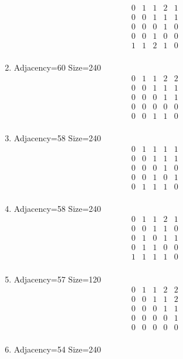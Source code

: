 \documentclass[12pt]{article}
\begin{document}
\begin{multicols}{3}
\begin{enumerate}
\begin{equation*}
\begin{array}{ccccc}
0&1&1&2&1\\
0&0&1&1&1\\
0&0&0&1&0\\
0&0&1&0&0\\
1&1&2&1&0\\
\end{array}
\end{equation*}
\item Adjacency=60 Size=240
\begin{equation*}
\begin{array}{ccccc}
0&1&1&2&2\\
0&0&1&1&1\\
0&0&0&1&1\\
0&0&0&0&0\\
0&0&1&1&0\\
\end{array}
\end{equation*}
\item Adjacency=58 Size=240
\begin{equation*}
\begin{array}{ccccc}
0&1&1&1&1\\
0&0&1&1&1\\
0&0&0&1&0\\
0&0&1&0&1\\
0&1&1&1&0\\
\end{array}
\end{equation*}
\item Adjacency=58 Size=240
\begin{equation*}
\begin{array}{ccccc}
0&1&1&2&1\\
0&0&1&1&0\\
0&1&0&1&1\\
0&1&1&0&0\\
1&1&1&1&0\\
\end{array}
\end{equation*}
\item Adjacency=57 Size=120
\begin{equation*}
\begin{array}{ccccc}
0&1&1&2&2\\
0&0&1&1&2\\
0&0&0&1&1\\
0&0&0&0&1\\
0&0&0&0&0\\
\end{array}
\end{equation*}
\item Adjacency=54 Size=240

\end{enumerate}
\end{multicols}
\end{document}

